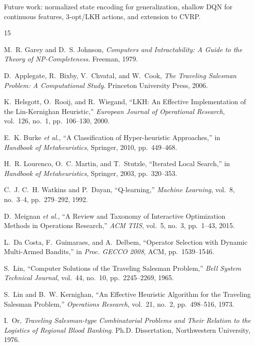 \documentclass[10pt,twocolumn]{article}
\begin{document}
Future work: normalized state encoding for generalization, shallow DQN for
continuous features, 3-opt/LKH actions, and extension to CVRP.


\begin{thebibliography}{15}

M.~R. Garey and D.~S. Johnson,
\textit{Computers and Intractability: A Guide to the Theory of NP-Completeness}.
Freeman, 1979.

D.~Applegate, R.~Bixby, V.~Chvatal, and W.~Cook,
\textit{The Traveling Salesman Problem: A Computational Study}.
Princeton University Press, 2006.

K.~Helsgott, O.~Rooij, and R.~Wiegand,
``LKH: An Effective Implementation of the Lin-Kernighan Heuristic,''
\textit{European Journal of Operational Research}, vol.~126, no.~1, pp.~106--130, 2000.

E.~K. Burke \textit{et al.},
``A Classification of Hyper-heuristic Approaches,''
in \textit{Handbook of Metaheuristics}, Springer, 2010, pp.~449--468.

H.~R. Lourenco, O.~C. Martin, and T.~Stutzle,
``Iterated Local Search,''
in \textit{Handbook of Metaheuristics}, Springer, 2003, pp.~320--353.

C.~J. C.~H. Watkins and P.~Dayan,
``Q-learning,''
\textit{Machine Learning}, vol.~8, no.~3--4, pp.~279--292, 1992.

D.~Meignan \textit{et al.},
``A Review and Taxonomy of Interactive Optimization Methods in Operations Research,''
\textit{ACM TIIS}, vol.~5, no.~3, pp.~1--43, 2015.

L.~Da Costa, F.~Guimaraes, and A.~Delbem,
``Operator Selection with Dynamic Multi-Armed Bandits,''
in \textit{Proc. GECCO 2008}, ACM, pp.~1539--1546.

S.~Lin,
``Computer Solutions of the Traveling Salesman Problem,''
\textit{Bell System Technical Journal}, vol.~44, no.~10, pp.~2245--2269, 1965.

S.~Lin and B.~W. Kernighan,
``An Effective Heuristic Algorithm for the Traveling Salesman Problem,''
\textit{Operations Research}, vol.~21, no.~2, pp.~498--516, 1973.

I.~Or,
\textit{Traveling Salesman-type Combinatorial Problems and Their Relation to the
Logistics of Regional Blood Banking}.
Ph.D. Dissertation, Northwestern University, 1976.


\end{thebibliography}
\end{document}
